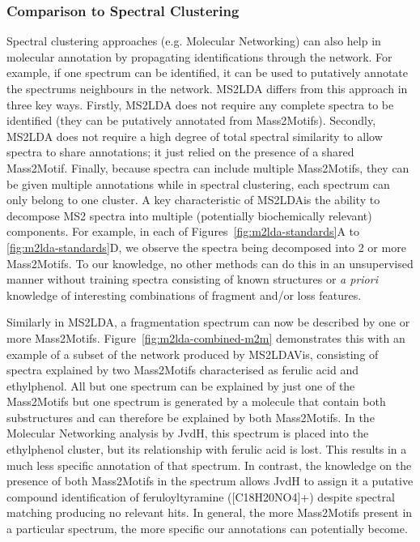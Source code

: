 \subsubsection{Comparison to Spectral Clustering}

Spectral clustering approaches (e.g. Molecular Networking) can also help in molecular annotation by propagating identifications through the network. For example, if one spectrum can be identified, it can be used to putatively annotate the spectrums neighbours in the network. MS2LDA differs from this approach in three key ways. Firstly, MS2LDA does not require any complete spectra to be identified (they can be putatively annotated from Mass2Motifs). Secondly, MS2LDA does not require a high degree of total spectral similarity to allow spectra to share annotations; it just relied on the presence of a shared Mass2Motif. Finally, because spectra can include multiple Mass2Motifs, they can be given multiple annotations while in spectral clustering, each spectrum can only belong to one cluster. A key characteristic of MS2LDAis the ability to decompose MS2 spectra into multiple (potentially biochemically relevant) components. For example, in each of Figures~\ref{fig:m2lda-standards}A to \ref{fig:m2lda-standards}D, we observe the spectra being decomposed into 2 or more Mass2Motifs. To our knowledge, no other methods can do this in an unsupervised manner without training spectra consisting of known structures or \textit{a priori} knowledge of interesting combinations of fragment and/or loss features.

Similarly in MS2LDA, a fragmentation spectrum can now be described by one or more Mass2Motifs. Figure~\ref{fig:m2lda-combined-m2m} demonstrates this with an example of a subset of the network produced by MS2LDAVis, consisting of spectra explained by two Mass2Motifs characterised as ferulic acid and ethylphenol. All but one spectrum can be explained by just one of the Mass2Motifs but one spectrum is generated by a molecule that contain both substructures and can therefore be explained by both Mass2Motifs. In the Molecular Networking analysis by JvdH, this spectrum is placed into the ethylphenol cluster, but its relationship with ferulic acid is lost. This results in a much less specific annotation of that spectrum. In contrast, the knowledge on the presence of both Mass2Motifs in the spectrum allows JvdH to assign it a putative compound identification of feruloyltyramine ([C18H20NO4]+) despite spectral matching producing no relevant hits. In general, the more Mass2Motifs present in a particular spectrum, the more specific our annotations can potentially become.

